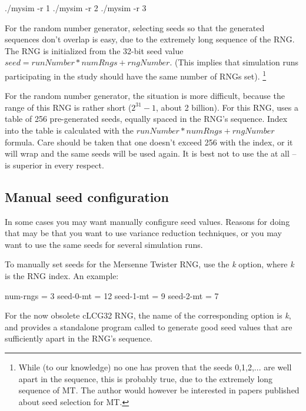 \begin{commandline}
./mysim -r 1
./mysim -r 2
./mysim -r 3
\end{commandline}

For the  random number generator, selecting seeds
so that the generated sequences don't overlap is easy,
due to the extremely long sequence of the RNG.
The RNG is initialized from the 32-bit seed value $seed = runNumber*numRngs + rngNumber$.
(This implies that simulation runs participating in the study should have
the same number of RNGs set).
    \footnote{While (to our knowledge) no one has proven that the seeds 0,1,2,...
    are well apart in the sequence, this is probably true, due to the extremely
    long sequence of MT. The author would however be interested in papers
    published about seed selection for MT.}

For the  random number generator, the situation is more difficult,
because the range of this RNG is rather short ($2^{31}-1$, about 2 billion).
For this RNG, {\opp} uses a table of 256 pre-generated seeds, equally spaced
in the RNG's sequence. Index into the table is calculated with the
$runNumber*numRngs + rngNumber$ formula. Care should be taken that
one doesn't exceed 256 with the index, or it will wrap and the
same seeds will be used again. It is best not to use the 
at all --  is superior in every respect.


\subsection{Manual seed configuration}

In some cases you may want manually configure seed values.
Reasons for doing that may be that you want to use variance reduction
techniques, or you may want to use the same seeds for several simulation
runs.

To manually set seeds for the Mersenne Twister RNG, use the \textit{k}
option, where \textit{k} is the RNG index. An example:

\begin{inifile}
[General]
num-rngs = 3
seed-0-mt = 12
seed-1-mt = 9
seed-2-mt = 7
\end{inifile}

\label{sec:ch-config-sim:seedtool}

For the now obsolete cLCG32 RNG, the name of the corresponding option is
\textit{k}, and {\opp} provides a standalone program
called  to generate good seed values that
are sufficiently apart in the RNG's sequence.


